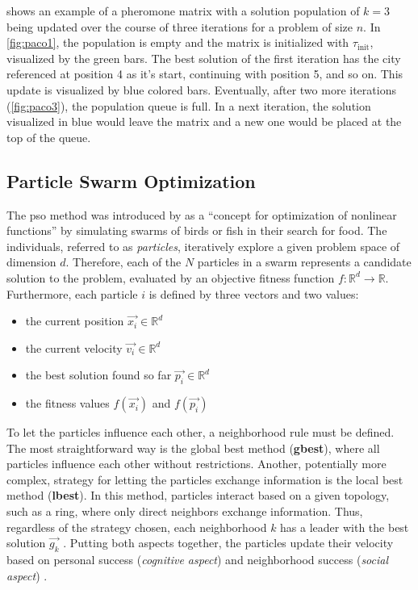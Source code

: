  shows an example of a pheromone matrix with a solution population of $k=3$ being updated over the course of three iterations for a problem of size $n$. In \cref{fig:paco1}, the population is empty and the matrix is initialized with $\tau_{\text{init}}$, visualized by the green bars. The best solution of the first iteration has the city referenced at position 4 as it's start, continuing with position 5, and so on. This update is visualized by blue colored bars. Eventually, after two more iterations (\cref{fig:paco3}), the population queue is full. In a next iteration, the solution visualized in blue would leave the matrix and a new one would be placed at the top of the queue.

\subsection{Particle Swarm Optimization}

The \gls{pso} method was introduced by \citet{kennedy1995particle} as a \enquote{concept for optimization of nonlinear functions} by simulating swarms of birds or fish in their search for food. The individuals, referred to as \textit{particles}, iteratively explore a given problem space of dimension $d$. Therefore, each of the $N$ particles in a swarm represents a candidate solution to the problem, evaluated by an objective fitness function $f: \mathbb{R}^d \to \mathbb{R}$. Furthermore, each particle $i$ is defined by three vectors and two values:
\begin{itemize}
	\item the current position $\vec{x_i} \in \mathbb{R}^d$ 
	\item the current velocity $\vec{v_i} \in \mathbb{R}^d$ 
	\item the best solution found so far $\vec{p_i} \in \mathbb{R}^d$
	\item the fitness values $f(\vec{x_i})$ and $f(\vec{p_i})$
\end{itemize}

To let the particles influence each other, a neighborhood rule must be defined. The most straightforward way is the global best method (\textbf{gbest}), where all particles influence each other without restrictions. Another, potentially more complex, strategy for letting the particles exchange information is the local best method (\textbf{lbest}). In this method, particles interact based on a given topology, such as a ring, where only direct neighbors exchange information. Thus, regardless of the strategy chosen, each neighborhood $k$ has a leader with the best solution $\vec{g_k}$ \cite{talbi2009metaheuristics}. Putting both aspects together, the particles update their velocity based on personal success (\textit{cognitive aspect}) and neighborhood success (\textit{social aspect}) \cite{janson2003hierarchical}. 

